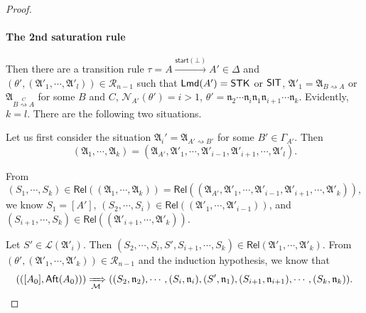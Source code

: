\documentclass[preprint,12pt]{elsarticle}
\newcommand\Mm{{\mathcal{M} }}
\newcommand\act{{\sf Act}}
\newcommand\aft{{\sf Aft}}
\newcommand\lmd{{\sf Lmd}}
\newcommand\singleinstance{{\sf SIT}}
\newcommand\startactivity{{\mathsf{start} }}
\newcommand\namefun{\mathcal{N}}
\newcommand\aname{\mathfrak{n}}
\newcommand\AutReach{\mathscr{R}}
\newcommand\Rel{\mathsf{Rel}}
\newcommand{\STK}{\mathsf{STK}}
\newcommand\Aut{{\mathfrak{A} }}
\newcommand\Lang{{\mathscr{L} }}
\begin{document}
\begin{proof}


\paragraph*{The 2nd saturation rule} Then there are a transition rule $\tau = A \xrightarrow{\startactivity(\bot)} A'  \in \Delta$ and $(\theta', (\Aut'_1, \cdots, \Aut'_l)) \in \AutReach_{n-1}$ such that $\lmd(A')=\STK$ or $\singleinstance$, $\Aut'_1 = \Aut_{B \rightsquigarrow A}$ or $\Aut_{B \stackrel{C}{\rightsquigarrow} A}$ for some $B$ and $C$, $\namefun_{A'}(\theta') = i > 1$, 
$\theta' = \aname_2  \cdots  \aname_{i} \aname_1  \aname_{i+1}  \cdots  \aname_k$.
Evidently, $k = l$. There are the following two situations. 

Let us first consider the situation $\Aut_i' = \Aut_{A'\rightsquigarrow B'}$ for some $B' \in \Gamma_{A'}$. 
Then 
%
$$(\Aut_1, \cdots, \Aut_k) = (\Aut_{A'}, \Aut'_1, \cdots, \Aut'_{i-1}, \Aut'_{i+1}, \cdots, \Aut'_l).$$  

From 
%
$$(S_1, \cdots, S_k) \in \Rel((\Aut_1, \cdots, \Aut_k)) = \Rel((\Aut_{A'}, \Aut'_1, \cdots, \Aut'_{i-1}, \Aut'_{i+1}, \cdots, \Aut'_k)),$$ 
%
we know $S_1 = [A']$, $(S_2, \cdots, S_i) \in \Rel((\Aut'_1, \cdots, \Aut'_{i-1}))$, and $(S_{i+1}, \cdots, S_k) \in \Rel((\Aut'_{i+1}, \cdots, \Aut'_k))$. 

Let $S' \in \Lang(\Aut'_i)$. Then $(S_2, \cdots, S_i, S', S_{i+1}, \cdots, S_k) \in \Rel(\Aut'_1, \cdots, \Aut'_k)$.
From $(\theta', (\Aut'_1, \cdots, \Aut'_k)) \in \AutReach_{n-1}$ and the induction hypothesis, we know that  
%
$$(([A_0], \aft(A_0))) \xRightarrow[\Mm]{} ((S_2, \aname_2), \cdots, (S_i, \aname_i), (S', \aname_1), (S_{i+1}, \aname_{i+1}), \cdots, (S_k, \aname_k)).$$ 


\end{proof}
\end{document}
